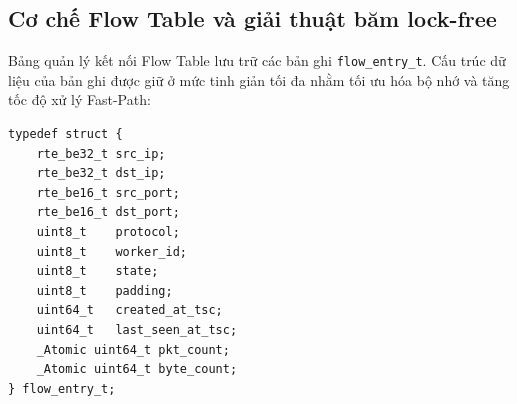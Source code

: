 \documentclass[12pt,a4paper,twoside]{report}
\begin{document}
\begin{table}[H]
    \centering
    \caption{Phân vùng lưu trữ dữ liệu hệ thống}
    \label{tab:mem_partitioning}
\end{table}

\subsection{Cơ chế Flow Table và giải thuật băm lock-free}
Bảng quản lý kết nối Flow Table lưu trữ các bản ghi \texttt{flow\_entry\_t}. Cấu trúc dữ liệu của bản ghi được giữ ở mức tinh giản tối đa nhằm tối ưu hóa bộ nhớ và tăng tốc độ xử lý Fast-Path:
\begin{verbatim}
typedef struct {
    rte_be32_t src_ip;
    rte_be32_t dst_ip;
    rte_be16_t src_port;
    rte_be16_t dst_port;
    uint8_t    protocol;
    uint8_t    worker_id;
    uint8_t    state;
    uint8_t    padding;
    uint64_t   created_at_tsc;
    uint64_t   last_seen_at_tsc;
    _Atomic uint64_t pkt_count;
    _Atomic uint64_t byte_count;
} flow_entry_t;
\end{verbatim}
\end{document}
